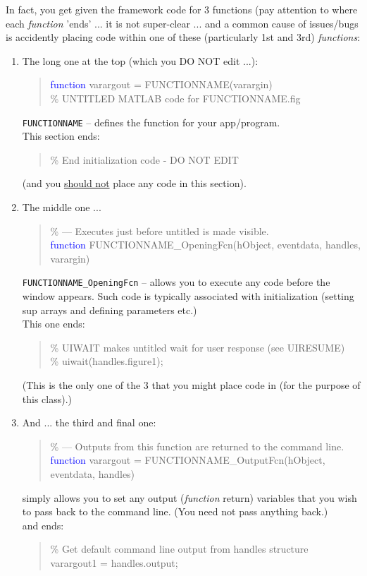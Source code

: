 \documentclass{tufte-book} %
\newenvironment{docspec}{\begin{quotation}\ttfamily\parskip0pt\parindent0pt\ignorespaces}{\end{quotation}}
\begin{document}
In fact, you get given the framework code for 3 functions (pay attention to where each \textit{function} 'ends' ... it is not super-clear ... and a common cause of issues/bugs is accidently placing code within one of these (particularly 1st and 3rd) \textit{functions}:
\vspace{-2mm}
\begin{enumerate}[noitemsep]
\vspace{2mm}
\item The long one at the top (which you DO NOT edit ...):
\begin{docspec}
\textcolor{blue}{function} varargout = FUNCTIONNAME(varargin)\\
\textcolor[rgb]{0,0.501961,0}{\% UNTITLED MATLAB code for FUNCTIONNAME.fig}
\end{docspec}
\texttt{FUNCTIONNAME} -- defines the function for your app/program.
\\This section ends:
\begin{docspec}
\textcolor[rgb]{0,0.501961,0}{\% End initialization code - DO NOT EDIT}
\end{docspec}
(and you \uline{should not} place any code in this section).
\vspace{2mm}
\item  The middle one ...
\begin{docspec}
\textcolor[rgb]{0,0.501961,0}{\% --- Executes just before untitled is made visible.}\\
\textcolor{blue}{function} FUNCTIONNAME\_OpeningFcn(hObject, eventdata, handles, varargin)
\end{docspec}
\texttt{FUNCTIONNAME\_OpeningFcn} -- allows you to execute any code before the window appears. Such code is typically associated with initialization (setting sup arrays and defining parameters etc.)
\\This one ends:
\begin{docspec}
\textcolor[rgb]{0,0.501961,0}{\% UIWAIT makes untitled wait for user response (see UIRESUME)\\
\% uiwait(handles.figure1);}
\end{docspec}
(This is the only one of the 3 that you might place code in (for the purpose of this class).)
\vspace{2mm}
\item And ... the third and final one:
\begin{docspec}
\textcolor[rgb]{0,0.501961,0}{\% --- Outputs from this function are returned to the command line.}\\
\textcolor{blue}{function} varargout = FUNCTIONNAME\_OutputFcn(hObject, eventdata, handles) 
\end{docspec}
simply allows you to set any output (\textit{function} return) variables that you wish to pass back to the command line. (You need not pass anything back.)
\\and ends:
\begin{docspec}
\textcolor[rgb]{0,0.501961,0}{\% Get default command line output from handles structure}\\
varargout{1} = handles.output;
\end{docspec}
\end{enumerate}
\end{document}
